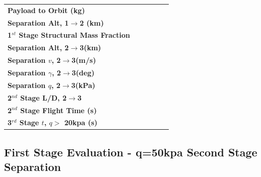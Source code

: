 \begin{table}[htb]
\begin{tabular}{l c c c c c}
		\hline \textbf{Payload to Orbit (kg)}  & \PayloadToOrbitConstq & \PayloadToOrbitFiftykPa & \PayloadToOrbitFortyFivekPa & \PayloadToOrbitFiftyFivekPa & \PayloadToOrbitHighDrag \\ 
		\textbf{Separation Alt, 1$\rightarrow$2 (km)}  & \FirstStageAltConstq & \FirstStageAltFifty & \FirstStageAltFortyFive &  \FirstStageAltFiftyFive &\FirstStageAltHighDrag \\ 
		\textbf{1$^{st}$ Stage Structural Mass Fraction} & \FirstStagesmfConstq & \FirstStagesmfFifty &  \FirstStagesmfFortyFive& \FirstStagesmfFiftyFive  & \FirstStagesmfHighDrag\\ 
		\textbf{Separation Alt, 2$\rightarrow$3(km)}  & \SeparationAltConstq & \SeparationAltFiftykPa & \SeparationAltFortyFivekPa & \SeparationAltFiftyFivekPa & \SeparationAltHighDrag\\ 
		\textbf{Separation $v$, 2$\rightarrow$3(m/s)} & \SeparationvConstq  & \SeparationvFiftykPa & \SeparationvFortyFivekPa &  \SeparationvFiftyFivekPa & \SeparationvHighDrag\\ 
		\textbf{Separation $\gamma$, 2$\rightarrow$3(deg)} & \SeparationAngleConstq& \SeparationAngleFiftykPa &\SeparationAngleFortyFivekPa& \SeparationAngleFiftyFivekPa&\SeparationAngleHighDrag \\ 
		\textbf{Separation $q$, 2$\rightarrow$3(kPa)} & \SeparationqConstq  &\SeparationqFiftykPa&\SeparationqFortyFivekPa &\SeparationqFiftyFivekPa& \SeparationqHighDrag \\ 
		\textbf{2$^{nd}$ Stage L/D, 2$\rightarrow$3} & \SeparationLDConstq&\SeparationLDFiftykPa & \SeparationLDFortyFivekPa & \SeparationLDFiftyFivekPa &\SeparationLDHighDrag\\
		\textbf{2$^{nd}$ Stage Flight Time (s)} & \FlightTimeConstq & \FlightTimeFiftykPa & \FlightTimeFortyFivekPa & \FlightTimeFiftyFivekPa & \FlightTimeHighDrag\\ 
		\textbf{3$^{rd}$ Stage $t$, $q >$ 20kpa (s)} &\toverConstq &\toverFiftykPa &\toverFortyFivekPa &\toverFiftyFivekPa & \toverHighDrag\\ 
		
		
		\hline 
	\end{tabular} 
	
	
	\label{table:Summary}
\end{table}


\subsection{First Stage Evaluation - q=50kpa Second Stage Separation}

